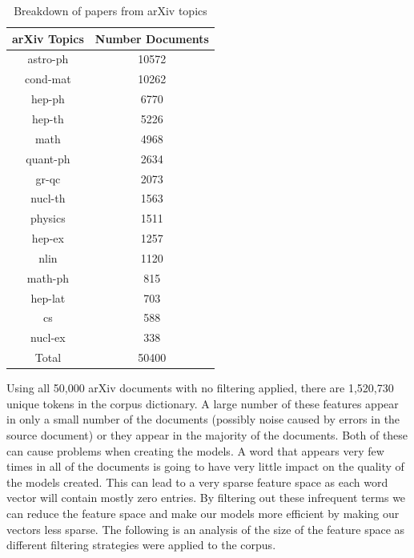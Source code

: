 \begin{table}[h]
    \centering
    \begin{tabular}{|c c|}
         \hline
         arXiv Topics & Number Documents \\ [0.5ex]
         \hline\hline
         astro-ph & 10572 \\
         cond-mat & 10262 \\
         hep-ph & 6770 \\
         hep-th & 5226 \\
         math & 4968 \\
         quant-ph & 2634 \\
         gr-qc & 2073 \\
         nucl-th & 1563 \\
         physics & 1511 \\
         hep-ex & 1257 \\
         nlin & 1120 \\
         math-ph & 815 \\
         hep-lat & 703 \\
         cs & 588 \\
         nucl-ex & 338 \\ [0.5ex]
         \hline\hline
         Total & 50400\\ [1ex]
         \hline
    \end{tabular}
    \caption{Breakdown of papers from arXiv topics}
    \label{table:arxivBreakdown}
\end{table}

Using all 50,000 arXiv documents with no filtering applied, there are 1,520,730 unique tokens in the corpus dictionary.
A large number of these features appear in only a small number of the documents (possibly noise caused by errors in the source document) or they appear in the majority of the documents.
Both of these can cause problems when creating the models.
A word that appears very few times in all of the documents is going to have very little impact on the quality of the models created.
This can lead to a very sparse feature space as each word vector will contain mostly zero entries.
By filtering out these infrequent terms we can reduce the feature space and make our models more efficient by making our vectors less sparse. The following is an analysis of the size of the feature space as different filtering strategies were applied to the corpus.

